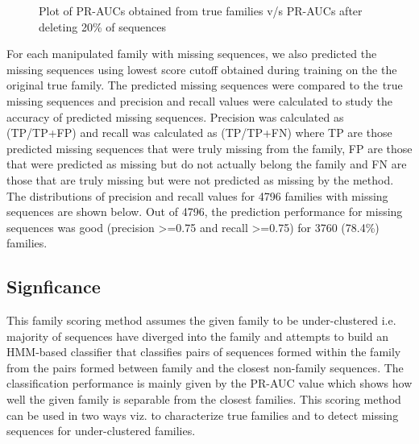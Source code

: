 \documentclass{article}
\begin{document}
		\begin{figure}
			\caption{Plot of PR-AUCs obtained from true families v/s PR-AUCs after deleting 20\% of sequences}
			\label{fig:scatter_pr-auc_true_vs_pr-auc_delete_ygob}
		\end{figure}
	
		For each manipulated family with missing sequences, we also predicted the missing sequences using lowest score cutoff obtained during training on the the original true family. The predicted missing sequences were compared to the true missing sequences and precision and recall values were calculated to study the accuracy of predicted missing sequences. Precision was calculated as (TP/TP+FP) and recall was calculated as (TP/TP+FN) where TP are those predicted missing sequences that were truly missing from the family, FP are those that were predicted as missing but do not actually belong the family and FN are those that are truly missing but were not predicted as missing by the method. The distributions of precision and recall values for 4796 families with missing sequences are shown below. Out of 4796, the prediction performance for missing sequences was good (precision >=0.75 and recall >=0.75) for 3760 (78.4\%) families.
		
		\subsection{Signficance}
		This family scoring method assumes the given family to be under-clustered i.e. majority of sequences have diverged into the family and attempts to build an HMM-based classifier that classifies pairs of sequences formed within the family from the pairs formed between family and the closest non-family sequences. The classification performance is mainly given by the PR-AUC value which shows how well the given family is separable from the closest families. This scoring method can be used in two ways viz. to characterize true families and to detect missing sequences for under-clustered families. 
		
\end{document}
